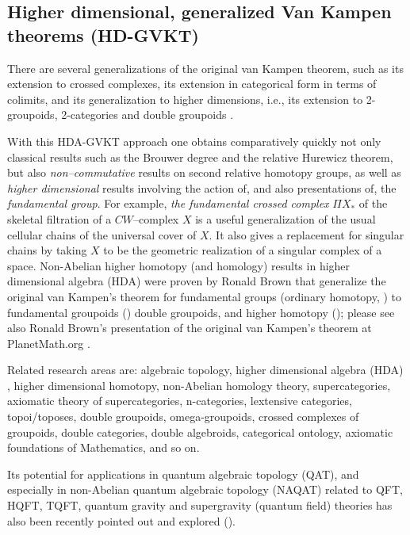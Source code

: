 \documentclass[12pt]{article}
\theoremstyle{plain}
\theoremstyle{definition}
\numberwithin{equation}{section}
\begin{document}
\subsection{Higher dimensional, generalized Van Kampen theorems (HD-GVKT)}

   There are several generalizations of the original van Kampen theorem, such as its 
extension to crossed complexes, its extension in categorical form in terms of colimits, and 
its generalization to higher dimensions, i.e., its extension to 2-groupoids, 2-categories and double 
groupoids \cite{BHKP}.

  With this HDA-GVKT approach one obtains comparatively quickly not only classical results such as the 
Brouwer degree and the relative Hurewicz theorem, but also \emph{non--commutative} results on 
second relative homotopy groups, as well as \emph{higher dimensional} results involving the 
action of, and also presentations of, the \emph{fundamental group}. For example, 
\emph{the fundamental crossed complex} $\Pi X_*$ of the skeletal filtration of a $CW$--complex $X$ is a 
useful generalization of the usual cellular chains of the universal cover of $X$. It also 
gives a replacement for singular chains by taking $X$ to be the geometric realization of a 
singular complex of a space. Non-Abelian higher homotopy (and homology) results in higher dimensional algebra (HDA) were proven by Ronald Brown that generalize the original van Kampen's theorem for fundamental groups (ordinary homotopy, \cite{kampen1-1933}) to fundamental groupoids (\cite{BR67}) double groupoids, and higher homotopy 
(\cite{BR-HPJ-SR2k5}); please see also Ronald Brown's presentation of the original van Kampen's theorem at PlanetMath.org \cite{VanKampen-sTheorem}.

 Related research areas are: algebraic topology, higher dimensional algebra (HDA) , higher dimensional homotopy, non-Abelian homology theory, supercategories, axiomatic theory of supercategories, n-categories, lextensive categories, topoi/toposes, double groupoids, omega-groupoids, crossed complexes of groupoids, double categories, double algebroids,
categorical ontology, axiomatic foundations of Mathematics, and so on.

 Its potential for applications in quantum algebraic topology (QAT), and especially in 
non-Abelian quantum algebraic topology (NAQAT) related to QFT, HQFT, TQFT,
quantum gravity and supergravity (quantum field) theories has also been recently
pointed out and explored (\cite{BGB2k7b, BBGG1, Bgb2}).
\end{document}
